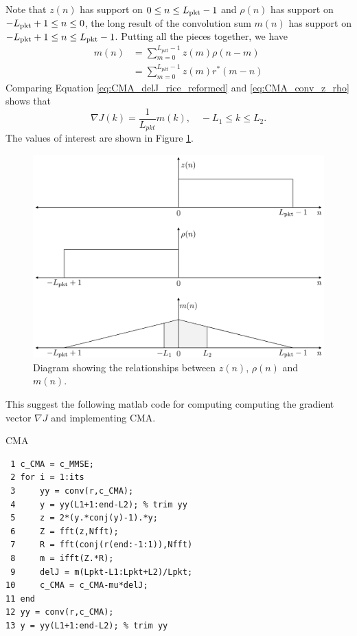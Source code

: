 Note that $z(n)$ has support on $0 \leq n \leq L_\text{pkt}-1$ and 
$\rho(n)$ has support on $-L_\text{pkt}+1 \leq n \leq 0$, 
the long result of the convolution sum $m(n)$ has support on $-L_\text{pkt}+1 \leq n \leq L_\text{pkt}-1$.
Putting all the pieces together, we have
\begin{align}
m(n) &= \sum^{L_{pkt}-1}_{m=0} z(m) \rho(n-m) \nonumber \\
	 &= \sum^{L_{pkt}-1}_{m=0} z(m) r^\ast(m-n)
	 \label{eq:CMA_conv_z_rho}
\end{align}
Comparing Equation \eqref{eq:CMA_delJ_rice_reformed} and \eqref{eq:CMA_conv_z_rho} shows that 
\begin{equation}
\nabla J(k) = \frac{1}{L_{pkt}} m(k), \quad -L_1 \leq k \leq L_2.
\label{eq:CMA_delJ_donzo}
\end{equation}
The values of interest are shown in Figure \ref{fig:convolutionFigureRice}.
\begin{figure}
	\centering\includegraphics[width=10in/100*55]{figures/eq_equations/convolutionFigureRice.pdf}
	\caption{Diagram showing the relationships between $z(n)$, $\rho(n)$ and $m(n)$.}
	\label{fig:convolutionFigureRice}
\end{figure}

This suggest the following matlab code for computing computing the gradient vector $\nabla J$ and implementing CMA.
\begin{table}[h]
\caption{CMA}
\label{code:CMA}
\singlespacing
{\footnotesize
\begin{verbatim}
 1 c_CMA = c_MMSE;
 2 for i = 1:its
 3 	   yy = conv(r,c_CMA);
 4     y = yy(L1+1:end-L2); % trim yy
 5     z = 2*(y.*conj(y)-1).*y;
 6     Z = fft(z,Nfft);
 7     R = fft(conj(r(end:-1:1)),Nfft)
 8     m = ifft(Z.*R);
 9     delJ = m(Lpkt-L1:Lpkt+L2)/Lpkt;
10     c_CMA = c_CMA-mu*delJ;
11 end
12 yy = conv(r,c_CMA);
13 y = yy(L1+1:end-L2); % trim yy
\end{verbatim}
}
\end{table}
\doublespacing

